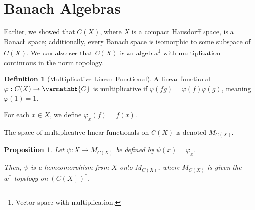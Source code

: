 \documentclass[12pt]{extarticle}
\newcommand{\C}{\mathbb{C}}
\theoremstyle{plain}
\newtheorem*{proposition}{Proposition}
\theoremstyle{definition}
\newtheorem*{definition}{Definition}
\theoremstyle{note}
\renewcommand*{\mathbb}[1]{\varmathbb{#1}}
\renewcommand{\newline}{\hfill\break}
\begin{document}
\section{Banach Algebras}%
Earlier, we showed that $C(X)$, where $X$ is a compact Hausdorff space, is a Banach space; additionally, every Banach space is isomorphic to some subspace of $C(X)$. We can also see that $C(X)$ is an algebra\footnote{Vector space with multiplication.} with multiplication continuous in the norm topology.
\begin{definition}[Multiplicative Linear Functional]
  A linear functional $\varphi: C(X) \rightarrow \C$ is multiplicative if $\varphi(fg) = \varphi(f)\varphi(g)$, meaning $\varphi(1) = 1$.\newline

  For each $x\in X$, we define $\varphi_x(f) = f(x)$.\newline

  The space of multiplicative linear functionals on $C(X)$ is denoted $M_{C(X)}$.
\end{definition}
\begin{proposition}
  Let $\psi: X\rightarrow M_{C(X)}$ be defined by $\psi(x) = \varphi_x$.\newline

  Then, $\psi$ is a homeomorphism from $X$ onto $M_{C(X)}$, where $M_{C(X)}$ is given the $w^{\ast}$-topology on $\left(C(X)\right)^{\ast}$.
\end{proposition}
\end{document}
